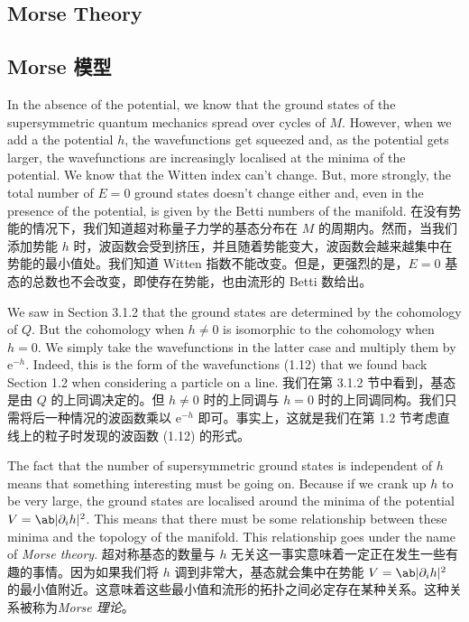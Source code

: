 \documentclass{article}
\newcommand{\rme}{\mathrm{e}}
\begin{document}
\begin{paracol}{2}
\subsection{Morse Theory}
\switchcolumn
\subsection*{Morse 模型}
\switchcolumn*

In the absence of the potential, we know that the ground states of the supersymmetric quantum mechanics spread over cycles of $M$. However, when we add a the potential $h$, the wavefunctions get squeezed and, as the potential gets larger, the wavefunctions are increasingly localised at the minima of the potential. We know that the Witten index can’t change. But, more strongly, the total number of $E = 0$ ground states doesn’t change either and, even in the presence of the potential, is given by the Betti numbers of the manifold.
\switchcolumn
在没有势能的情况下，我们知道超对称量子力学的基态分布在 $M$ 的周期内。然而，当我们添加势能 $h$ 时，波函数会受到挤压，并且随着势能变大，波函数会越来越集中在势能的最小值处。我们知道 Witten 指数不能改变。但是，更强烈的是，$E = 0$ 基态的总数也不会改变，即使存在势能，也由流形的 Betti 数给出。
\switchcolumn*

We saw in Section 3.1.2 that the ground states are determined by the cohomology of $Q$. But the cohomology when $h \neq 0$ is isomorphic to the cohomology when $h = 0$. We simply take the wavefunctions in the latter case and multiply them by $\rme^{- h}$. Indeed, this is the form of the wavefunctions (1.12) that we found back Section 1.2 when considering a particle on a line.
\switchcolumn
我们在第 3.1.2 节中看到，基态是由 $Q$ 的上同调决定的。但 $h \neq 0$ 时的上同调与 $h = 0$ 时的上同调同构。我们只需将后一种情况的波函数乘以 $\rme^{- h}$ 即可。事实上，这就是我们在第 1.2 节考虑直线上的粒子时发现的波函数 (1.12) 的形式。
\switchcolumn*

The fact that the number of supersymmetric ground states is independent of $h$ means that something interesting must be going on. Because if we crank up $h$ to be very large, the ground states are localised around the minima of the potential $V = \ab|\partial_i h|^2$. This means that there must be some relationship between these minima and the topology of the manifold. This relationship goes under the name of \textit{Morse theory}.
\switchcolumn
超对称基态的数量与 $h$ 无关这一事实意味着一定正在发生一些有趣的事情。因为如果我们将 $h$ 调到非常大，基态就会集中在势能 $V = \ab|\partial_i h|^2$ 的最小值附近。这意味着这些最小值和流形的拓扑之间必定存在某种关系。这种关系被称为\textit{Morse 理论}。
\switchcolumn*


\end{paracol}
\end{document}
